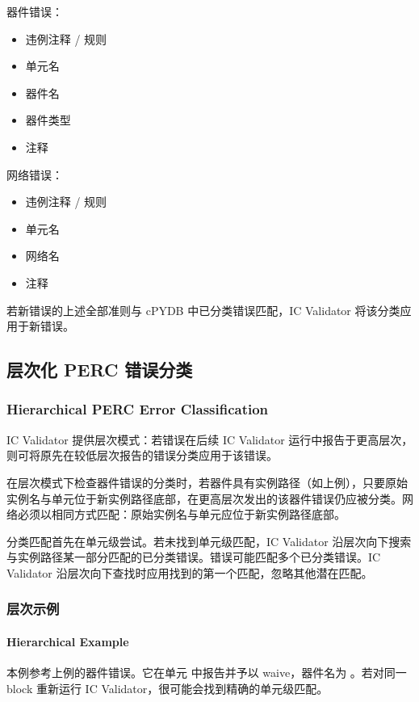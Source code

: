 器件错误：
\begin{itemize}
  \item 违例注释 / 规则
  \item 单元名
  \item 器件名
  \item 器件类型
  \item 注释
\end{itemize}

网络错误：
\begin{itemize}
  \item 违例注释 / 规则
  \item 单元名
  \item 网络名
  \item 注释
\end{itemize}

若新错误的上述全部准则与 cPYDB 中已分类错误匹配，IC Validator 将该分类应用于新错误。

\subsection{层次化 PERC 错误分类}
\subsubsection*{Hierarchical PERC Error Classification}

IC Validator 提供层次模式：若错误在后续 IC Validator 运行中报告于更高层次，则可将原先在较低层次报告的错误分类应用于该错误。

在层次模式下检查器件错误的分类时，若器件具有实例路径（如上例），只要原始实例名与单元位于新实例路径底部，在更高层次发出的该器件错误仍应被分类。网络必须以相同方式匹配：原始实例名与单元应位于新实例路径底部。

分类匹配首先在单元级尝试。若未找到单元级匹配，IC Validator 沿层次向下搜索与实例路径某一部分匹配的已分类错误。错误可能匹配多个已分类错误。IC Validator 沿层次向下查找时应用找到的第一个匹配，忽略其他潜在匹配。

\subsubsection{层次示例}
\paragraph*{Hierarchical Example}

本例参考上例的器件错误。它在单元  中报告并予以 waive，器件名为 。若对同一 block 重新运行 IC Validator，很可能会找到精确的单元级匹配。

